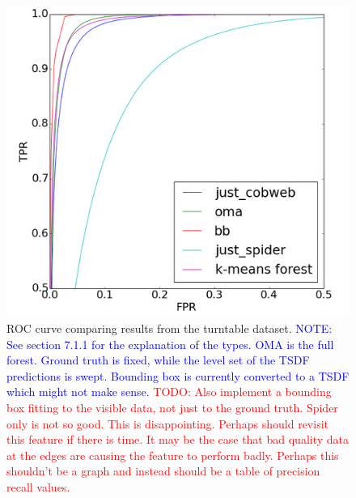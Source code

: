 \documentclass[10pt,twocolumn,letterpaper]{article}
\newcommand{\todo}[1]{\textcolor{red}{TODO: #1}}
\newcommand{\note}[1]{\textcolor{blue}{NOTE: #1}}
\begin{document}
\begin{figure}[bt]
  \centering 
  \includegraphics[width=0.9\columnwidth]{roc_curve.png}
  \caption{ROC curve comparing results from the turntable dataset. 
  \note{See section 7.1.1 for the explanation of the types. OMA is the full forest. Ground truth is fixed, while the level set of the TSDF predictions is swept. Bounding box is currently converted to a TSDF which might not make sense.}
  \todo{Also implement a bounding box fitting to the visible data, not just to the ground truth. Spider only is not so good. This is disappointing. Perhaps should revisit this feature if there is time. It may be the case that bad quality data at the edges are causing the feature to perform badly. Perhaps this shouldn't be a graph and instead should be a table of precision recall values.}
  }
  \label{fig:bigbird_roc}
\end{figure}


\end{document}
